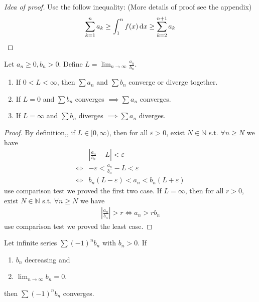 \documentclass[
	UTF-8,
	11pt, %
	a4paper, %
]{LegrandOrangeBook}
\begin{document}
    \begin{proof}[Idea of proof]
        Use the follow inequality: (More details of proof see the appendix)
        $$
        \displaystyle \sum_{k=1}^{n} a_k \geq \int_{1}^{n} f(x) \, \mathrm{d} x \geq \sum_{k=2}^{n+1} a_k
        $$
    \end{proof}

    \begin{theorem}
        Let $a_n \geq 0, b_n > 0$. Define $L = \lim_{n \to \infty} \frac{a_n}{b_n}$. 
        \begin{enumerate}
            \item If $0 < L < \infty$, then $\sum a_n$ and $\sum b_n$ converge or diverge together.
            \item If $L = 0$ and $\sum b_n$ converges $\implies \sum a_n$ converges.
            \item If $L = \infty$ and $\sum b_n$ diverges $\implies \sum a_n$ diverges.
        \end{enumerate}
    \end{theorem}

    \begin{proof}
        By definition,, if $L \in [0,\infty)$, 
        then for all $\varepsilon>0$, exist $N \in \mathbb{N}$ s.t. $\forall n \geq N$ we have
        \begin{align*}
            &\left| \frac{a_n}{b_n} - L \right| < \varepsilon \\
            \iff &-\varepsilon <  \frac{a_n}{b_n} - L  < \varepsilon \\
            \iff &b_n \left( L - \varepsilon \right) <  a_n  < b_n \left( L + \varepsilon \right) 
        \end{align*}
        use comparison test we proved the first two case. If $L = \infty$, then 
        for all $r > 0$, exist $N \in \mathbb{N}$ s.t. $\forall n \geq N$ we have
        \begin{align*}
            \left| \frac{a_n}{b_n} \right| > r 
            \iff  a_n > r b_n
        \end{align*}
        use comparison test we proved the least case.
    \end{proof}

    \begin{theorem} 

        Let infinite series $\sum (-1)^n b_n$ with $b_n > 0$. If
            \begin{enumerate}
                \item $b_n$ decreasing and
                \item $\lim_{n \to \infty} b_n = 0$.
            \end{enumerate}
            then $\sum (-1)^n b_n$ converges.
    \end{theorem}
\end{document}
